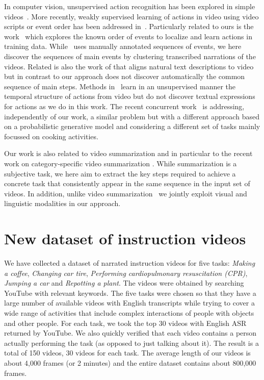\documentclass[10pt,twocolumn,letterpaper]{article}
\begin{document}
In computer vision, unsupervised action recognition has been explored in simple videos~\cite{Niebles08}. 
More recently, weakly supervised learning of actions in video using video scripts or event order has been addressed in~\cite{Bojanowski13finding,Bojanowski14weakly,Bojanowski15weakly,Duchenne2009automatic,Laptev08a}. 
Particularly related to ours is the work~\cite{Bojanowski14weakly} which explores the known order of events to localize and learn actions in training data. 
While~\cite{Bojanowski14weakly} uses manually annotated sequences of events, we here discover the sequences of main events by clustering  transcribed narrations of the videos. Related is also the work of
\cite{Bojanowski15weakly} that aligns natural text descriptions to video but in contrast to our approach does not discover automatically the common sequence of main steps. 
Methods in~\cite{Niebles10a,Raptis13} learn in an unsupervised manner the temporal structure of actions from video but do not discover textual expressions for actions as we do in this work.
The recent concurrent work~\cite{Sener15unsupervised} is addressing, independently of our work, a similar problem but with a different approach based on a probabilistic generative model and considering a different set of tasks mainly focussed on cooking activities.




Our work is also related to video summarization and in particular to the recent work on category-specific video summarization \cite{Potapov14category,Sun14ranking}. While summarization is a subjective task, we here aim to extract the key steps required to achieve a concrete task that  consistently appear in the same sequence in the input set of videos. In addition, unlike video summarization~\cite{Potapov14category,Sun14ranking} we jointly exploit visual and linguistic modalities in our approach.








\vspace{3mm}
\section{New dataset of instruction videos}
\label{sec:dataset}
We have collected a dataset of narrated instruction videos for five tasks: \textit{Making a coffee}, \textit{Changing car tire}, \textit{Performing cardiopulmonary resuscitation (CPR)}, \textit{Jumping a car} and \textit{Repotting a plant}. 
The videos were obtained by searching YouTube with relevant keywords. 
The five tasks were chosen so that they have a large number of available videos with English transcripts while trying to cover a wide range of activities that include complex interactions of people with objects and other people.
For each task, we took the top 30 videos with English ASR returned by YouTube.
We also quickly verified that each video contains a person actually performing the task (as opposed to just talking about it).
The result is a total of 150 videos, 30 videos for each task.
The average length of our videos is about 4,000 frames (or 2 minutes) and the entire dataset contains about 800,000 frames.
\end{document}
